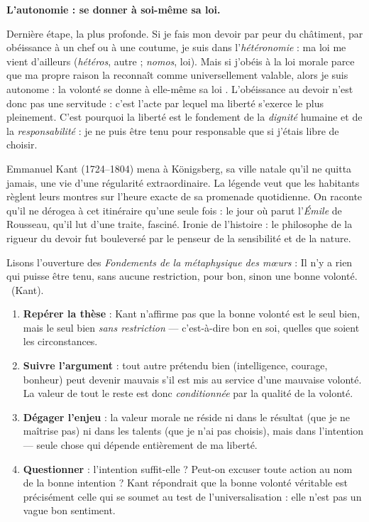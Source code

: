 \documentclass[11pt]{article}
\newcommand{\cle}[1]{{\popxbold\color{popdark}#1}}
\begin{document}
\textbf{L'autonomie : se donner à soi-même sa loi.}\par
Dernière étape, la plus profonde. Si je fais mon devoir par peur du châtiment, par obéissance à un chef ou à une coutume, je suis dans l'\emph{hétéronomie} : ma loi me vient d'ailleurs (\emph{hétéros}, autre ; \emph{nomos}, loi). Mais si j'obéis à la loi morale parce que ma propre raison la reconnaît comme universellement valable, alors je suis \cle{autonome} : la volonté \guillemotleft se donne à elle-même sa loi \guillemotright. L'obéissance au devoir n'est donc pas une servitude : c'est l'acte par lequel ma liberté s'exerce le plus pleinement. C'est pourquoi la liberté est le fondement de la \emph{dignité} humaine et de la \emph{responsabilité} : je ne puis être tenu pour responsable que si j'étais libre de choisir.

\begin{savaistu}
Emmanuel Kant (1724--1804) mena à Königsberg, sa ville natale qu'il ne quitta jamais, une vie d'une régularité extraordinaire. La légende veut que les habitants règlent leurs montres sur l'heure exacte de sa promenade quotidienne. On raconte qu'il ne dérogea à cet itinéraire qu'une seule fois : le jour où parut l'\emph{Émile} de Rousseau, qu'il lut d'une traite, fasciné. Ironie de l'histoire : le philosophe de la rigueur du devoir fut bouleversé par le penseur de la sensibilité et de la nature.
\end{savaistu}

\begin{experience}
Lisons l'ouverture des \emph{Fondements de la métaphysique des mœurs} : \guillemotleft Il n'y a rien qui puisse être tenu, sans aucune restriction, pour bon, sinon une bonne volonté. \guillemotright\ (Kant).
\begin{enumerate}
\item \textbf{Repérer la thèse} : Kant n'affirme pas que la bonne volonté est le seul bien, mais le seul bien \emph{sans restriction} --- c'est-à-dire bon en soi, quelles que soient les circonstances.
\item \textbf{Suivre l'argument} : tout autre prétendu bien (intelligence, courage, bonheur) peut devenir mauvais s'il est mis au service d'une mauvaise volonté. La valeur de tout le reste est donc \emph{conditionnée} par la qualité de la volonté.
\item \textbf{Dégager l'enjeu} : la valeur morale ne réside ni dans le résultat (que je ne maîtrise pas) ni dans les talents (que je n'ai pas choisis), mais dans l'intention --- seule chose qui dépende entièrement de ma liberté.
\item \textbf{Questionner} : l'intention suffit-elle ? Peut-on excuser toute action au nom de la \guillemotleft bonne intention \guillemotright ? Kant répondrait que la bonne volonté véritable est précisément celle qui se soumet au test de l'universalisation : elle n'est pas un vague bon sentiment.
\end{enumerate}
\end{experience}
\end{document}
